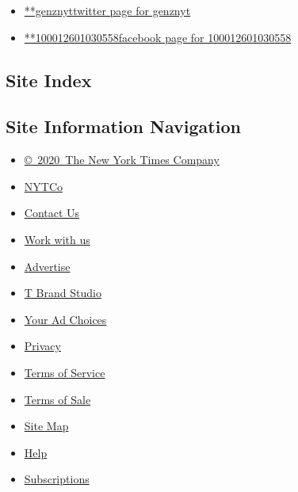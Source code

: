 \begin{itemize}
\tightlist
\item
  \href{https://twitter.com/genznyt}{**genznyttwitter page for genznyt}
\item
  \href{https://www.facebook.com/100012601030558}{**100012601030558facebook
  page for 100012601030558}
\end{itemize}

\hypertarget{site-index}{%
\subsection{Site Index}\label{site-index}}

\hypertarget{site-information-navigation}{%
\subsection{Site Information
Navigation}\label{site-information-navigation}}

\begin{itemize}
\tightlist
\item
  \href{https://help.nytimes.com/hc/en-us/articles/115014792127-Copyright-notice}{©~2020~The
  New York Times Company}
\end{itemize}

\begin{itemize}
\tightlist
\item
  \href{https://www.nytco.com/}{NYTCo}
\item
  \href{https://help.nytimes.com/hc/en-us/articles/115015385887-Contact-Us}{Contact
  Us}
\item
  \href{https://www.nytco.com/careers/}{Work with us}
\item
  \href{https://nytmediakit.com/}{Advertise}
\item
  \href{http://www.tbrandstudio.com/}{T Brand Studio}
\item
  \href{https://www.nytimes.com/privacy/cookie-policy\#how-do-i-manage-trackers}{Your
  Ad Choices}
\item
  \href{https://www.nytimes.com/privacy}{Privacy}
\item
  \href{https://help.nytimes.com/hc/en-us/articles/115014893428-Terms-of-service}{Terms
  of Service}
\item
  \href{https://help.nytimes.com/hc/en-us/articles/115014893968-Terms-of-sale}{Terms
  of Sale}
\item
  \href{https://spiderbites.nytimes.com}{Site Map}
\item
  \href{https://help.nytimes.com/hc/en-us}{Help}
\item
  \href{https://www.nytimes.com/subscription?campaignId=37WXW}{Subscriptions}
\end{itemize}
